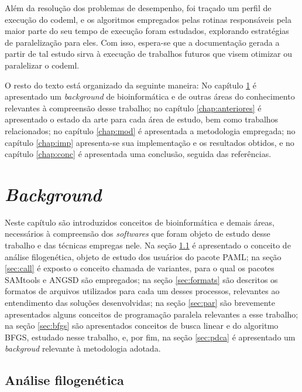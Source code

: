 \documentclass[cic,tc]{iiufrgs}
\begin{document}
Além da resolução dos problemas de desempenho, foi traçado um perfil de
execução do codeml, e os algoritmos empregados pelas rotinas responsáveis pela
maior parte do seu tempo de execução foram estudados, explorando estratégias de
paralelização para eles. Com isso, espera-se que a documentação gerada a partir
de tal estudo sirva à execução de trabalhos futuros que visem otimizar ou
paralelizar o codeml.

%
%
O resto do texto está organizado da seguinte maneira: No capítulo \ref{chap:bg}
é apresentado um \textit{background} de bioinformática e de outras áreas do
conhecimento relevantes à compreensão desse trabalho; no capítulo
\ref{chap:anteriores} é apresentado o estado da arte para cada área de estudo,
bem como trabalhos relacionados; no capítulo \ref{chap:mod} é apresentada a
metodologia empregada; no capítulo \ref{chap:imp} apresenta-se sua
implementação e os resultados obtidos, e no capítulo \ref{chap:conc} é
apresentada uma conclusão, seguida das referências.

%
%
%
%

\chapter{\textit{Background}}
\label{chap:bg}

Neste capítulo são introduzidos conceitos de bioinformática e demais áreas,
necessários à compreensão dos \textit{softwares} que foram objeto de estudo desse
trabalho e das técnicas empregas nele. Na seção \ref{sec:filo} é apresentado o
conceito de análise filogenética, objeto de estudo dos usuários do pacote PAML;
na seção \ref{sec:call} é exposto o conceito chamada de variantes, para o qual
os pacotes SAMtools e ANGSD são empregados; na seção \ref{sec:formats} são
descritos os formatos de arquivos utilizados para cada um desses processos,
relevantes ao entendimento das soluções desenvolvidas; na seção \ref{sec:par}
são brevemente apresentados alguns conceitos de programação paralela relevantes
a esse trabalho; na seção \ref{sec:bfgs} são apresentados conceitos de busca
linear e do algoritmo BFGS, estudado nesse trabalho, e, por fim, na seção
\ref{sec:pdca} é apresentado um \textit{backgroud} relevante à metodologia
adotada.


\section{Análise filogenética}
\label{sec:filo}
\end{document}

